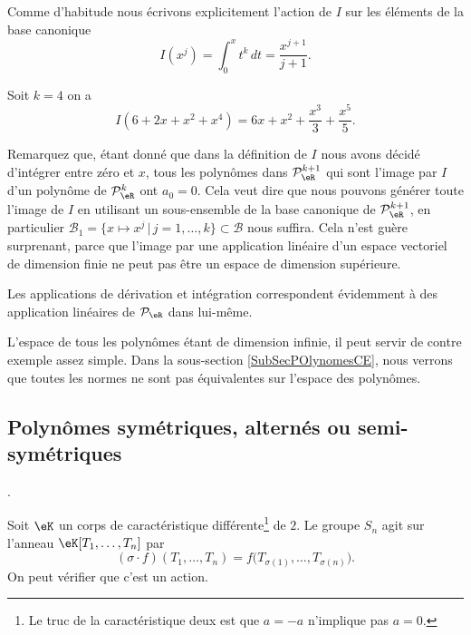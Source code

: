\begin{description}
Comme d'habitude nous écrivons explicitement l'action de $I$ sur les éléments de la base canonique
\begin{equation}
    I(x^j)=\int_0^x t^k \,dt= \frac{x^{j+1}}{j+1}.
\end{equation}

\begin{example} 
   Soit $k=4$ on a 
  \begin{equation}
    I(6+2x+x^2+x^4)= 6x+x^2+\frac{x^3}{3}+\frac{x^5}{5}.
    \end{equation}
\end{example}

Remarquez que, étant donné que dans la définition de $I$ nous avons décidé d'intégrer entre zéro et $x$, tous les polynômes dans $\mathcal{P}_\eR^{k+1}$ qui sont l'image par $I$ d'un polynôme de $\mathcal{P}_\eR^{k}$ ont $a_0=0$. Cela veut dire que nous pouvons générer toute l'image de $I$ en utilisant un sous-ensemble de la base canonique de $\mathcal{P}_\eR^{k+1}$,  en particulier $\mathcal{B}_1=\{x\mapsto x^j \,|\, j=1, \ldots, k\}\subset \mathcal{B}$ nous suffira. Cela n'est guère surprenant, parce que l'image par une application linéaire d'un espace vectoriel de dimension finie ne peut pas être un espace de dimension supérieure. 
\end{description}

Les applications de dérivation et intégration correspondent évidemment à des application linéaires de $\mathcal{P}_\eR$ dans lui-même. 

L'espace de tous les polynômes étant de dimension infinie, il peut servir de contre exemple assez simple. Dans la sous-section \ref{SubSecPOlynomesCE}, nous verrons que toutes les normes ne sont pas équivalentes sur l'espace des polynômes.



\subsection{Polynômes symétriques, alternés ou semi-symétriques}
\cite{fJhCTE}.

Soit \( \eK\) un corps de caractéristique différente\footnote{Le truc de la caractéristique deux est que \( a=-a\) n'implique pas \( a=0\).} de \(2\). Le groupe \( S_n\) agit sur l'anneau \( \eK[T_1,\ldots, T_n]\) par
\begin{equation}
    (\sigma\cdot f)(T_1,\ldots, T_n)=f\big( T_{\sigma(1)},\ldots, T_{\sigma(n)} \big).
\end{equation}
On peut vérifier que c'est un action.

